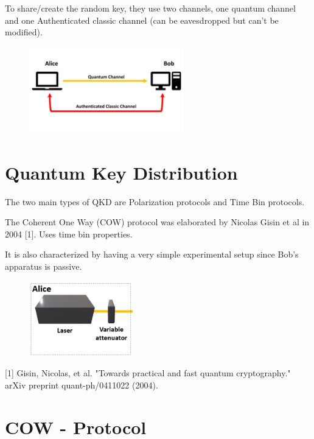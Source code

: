 \documentclass[1000pt]{article}
\newcommand{\mysection}[1]{\section*{\color{black}\sffamily #1}}%
\begin{document}
To share/create the random key, they use two channels, one quantum channel and one Authenticated classic channel (can be eavesdropped but can't be modified).

  \begin{figure}[hbt]
    	\centering
    	\includegraphics[width=0.6\textwidth]{./figures/All.pdf}
        	\label{All}
    \end{figure}




\mysection{\Huge Quantum Key Distribution} \Large
\vspace*{1cm}
The two main types of QKD are Polarization protocols and Time Bin protocols.

The Coherent One Way (COW) protocol was elaborated by Nicolas Gisin et al in 2004 [1]. 
Uses time bin properties.

It is also characterized by having a very simple experimental setup since Bob's apparatus is passive.

    \begin{figure}[hbt]
    	\centering
    	\includegraphics[width=0.4\textwidth]{./figures/Alice.png}
        	\label{bob}
    \end{figure}

\large
[1] Gisin, Nicolas, et al. "Towards practical and fast quantum cryptography." arXiv preprint quant-ph/0411022 (2004).



\mysection{\Huge COW - Protocol}\Large
\vspace*{0.3cm}
\end{document}
